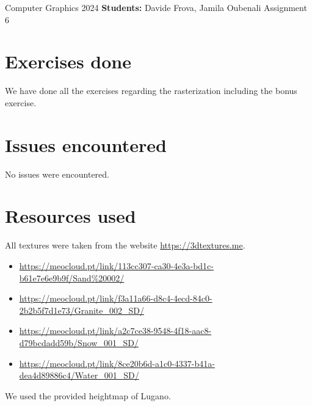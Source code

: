 \documentclass[unicode,11pt,a4paper,oneside,numbers=endperiod,openany]{scrartcl}
\begin{document}
\setassignment

\serieheader
{Computer Graphics}
{2024}
{\textbf{Students:} Davide Frova, Jamila Oubenali}
{}
{Assignment 6}{}

\section{Exercises done}
We have done all the exercises regarding the rasterization
including the bonus exercise.

\section{Issues encountered}
No issues were encountered.

\section{Resources used}
All textures were taken from the website
\url{https://3dtextures.me}.
\begin{itemize}
    \item \url{https://meocloud.pt/link/113cc307-ca30-4e3a-bd1c-b61e7e6e9b9f/Sand%20002/}
    \item \url{https://meocloud.pt/link/f3a11a66-d8c4-4ecd-84c0-2b2b5f7d1e73/Granite_002_SD/}
    \item \url{https://meocloud.pt/link/a2c7ce38-9548-4f18-aac8-d79bcdadd59b/Snow_001_SD/}
    \item \url{https://meocloud.pt/link/8ce20b6d-a1c0-4337-b41a-dea4d89886c4/Water_001_SD/}
\end{itemize}
We used the provided heightmap of Lugano.
\end{document}
